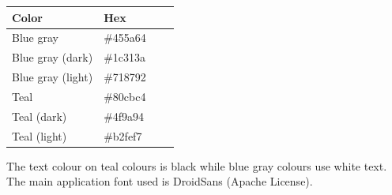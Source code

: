 \documentclass[12pt]{article}
\begin{document}
\begin{center}
    \begin{tabular}{ | l | l | l | p{5cm} |}
    \hline
     Color & Hex \\ \hline
     Blue gray & {\color[RGB]{69,90,100} \#455a64} \\ \hline
     Blue gray (dark) & {\color[RGB]{28,49,58} \#1c313a} \\ \hline
     Blue gray (light) & {\color[RGB]{113,135,146} \#718792} \\ \hline
     Teal & {\color[RGB]{128,203,196} \#80cbc4} \\
     Teal (dark) & {\color[RGB]{79,154,148} \#4f9a94} \\
     Teal (light) & {\color[RGB]{178,254,247} \#b2fef7} \\
    \hline
    \end{tabular}
\end{center}

The text colour on teal colours is black while blue gray colours use white text. The main application font used is DroidSans (Apache License).
\end{document}

